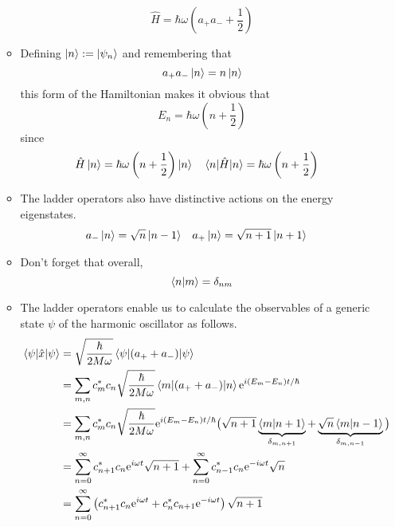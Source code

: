 \documentclass[../notes.tex]{subfiles}
\begin{document}
\begin{itemize}
\begin{itemize}
\begin{equation*}
            \hat{H} = \hbar\omega\left( a_+a_-+\frac{1}{2} \right)
        \end{equation*}
        \item Defining $\ket{n}:=\ket{\psi_n}$ and remembering that
        \begin{equation*}
            a_+a_-\ket{n} = n\ket{n}
        \end{equation*}
        this form of the Hamiltonian makes it obvious that
        \begin{equation*}
            E_n = \hbar\omega\left( n+\frac{1}{2} \right)
        \end{equation*}
        since
        \begin{align*}
            \hat{H}\ket{n} &= \hbar\omega\left( n+\frac{1}{2} \right)\ket{n}&
            \ev{\hat{H}}{n} &= \hbar\omega\left( n+\frac{1}{2} \right)
        \end{align*}
        \item The ladder operators also have distinctive actions on the energy eigenstates.
        \begin{align*}
            a_-\ket{n} &= \sqrt{n}\ket{n-1}&
            a_+\ket{n} &= \sqrt{n+1}\ket{n+1}
        \end{align*}
        \item Don't forget that overall,
        \begin{equation*}
            \braket{n}{m} = \delta_{nm}
        \end{equation*}
        \item The ladder operators enable us to calculate the observables of a generic state $\psi$ of the harmonic oscillator as follows.
        \begingroup
        \allowdisplaybreaks
        \begin{align*}
            \ev{\hat{x}}{\psi} &= \sqrt{\frac{\hbar}{2M\omega}}\ev{(a_++a_-)}{\psi}\\
            &= \sum_{m,n}c_m^*c_n\sqrt{\frac{\hbar}{2M\omega}}\mel{m}{(a_++a_-)}{n}\e[i(E_m-E_n)t/\hbar]\\
            &= \sum_{m,n}c_m^*c_n\sqrt{\frac{\hbar}{2M\omega}}\e[i(E_m-E_n)t/\hbar]\big( \sqrt{n+1}\underbrace{\braket{m}{n+1}}_{\delta_{m,n+1}}+\underbrace{\sqrt{n}\braket{m}{n-1}}_{\delta_{m,n-1}} \big)\\
            &= \sum_{n=0}^\infty c_{n+1}^*c_n\e[i\omega t]\sqrt{n+1}+\sum_{n=0}^\infty c_{n-1}^*c_n\e[-i\omega t]\sqrt{n}\\
            &= \sum_{n=0}^\infty\left( c_{n+1}^*c_n\e[i\omega t]+c_n^*c_{n+1}\e[-i\omega t] \right)\sqrt{n+1}

\end{align*}
\end{itemize}
\end{itemize}
\end{document}
